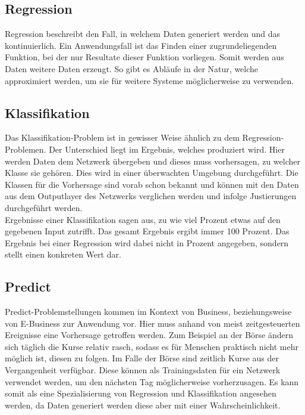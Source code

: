 \subsection{Regression}
\label{subsec:Regression}

Regression beschreibt den Fall, in welchem Daten generiert werden und das kontinuierlich.
Ein Anwendungsfall ist das Finden einer zugrundeliegenden Funktion, bei der nur Resultate dieser Funktion vorliegen. 
Somit werden aus Daten weitere Daten erzeugt.
So gibt es Abläufe in der Natur, welche approximiert werden, um sie für weitere Systeme möglicherweise zu verwenden. \cite{bishop2006pattern}

\subsection{Klassifikation}
\label{subsec:Classification}

Das Klassifikation-Problem ist in gewisser Weise ähnlich zu dem Regression-Problemen. 
Der Unterschied liegt im Ergebnis, welches produziert wird.  
Hier werden Daten dem Netzwerk übergeben und dieses muss vorhersagen, zu welcher Klasse sie gehören. Dies wird in einer überwachten Umgebung durchgeführt. 
Die Klassen für die Vorhersage sind vorab schon bekannt und können mit den Daten aus dem Outputlayer des Netzwerks verglichen werden und infolge Justierungen durchgeführt werden. \cite{AI3} \\

\noindent
Ergebnisse einer Klassifikation sagen aus, zu wie viel Prozent etwas auf den gegebenen Input zutrifft. 
Das gesamt Ergebnis ergibt immer 100 Prozent. 
Das Ergebnis bei einer Regression wird dabei nicht in Prozent angegeben, sondern stellt einen konkreten Wert dar.

\subsection{Predict}
\label{subsec:Predict}

Predict-Problemstellungen kommen im Kontext von Business, beziehungsweise von E-Business zur Anwendung vor. 
Hier muss anhand von meist zeitgesteuerten Ereignisse eine Vorhersage getroffen werden. 
Zum Beispiel an der Börse ändern sich täglich die Kurse relativ rasch, sodass es für Menschen praktisch nicht mehr möglich ist, diesen zu folgen. 
Im Falle der Börse sind zeitlich Kurse aus der Vergangenheit verfügbar. 
Diese können als Trainingsdaten für ein Netzwerk verwendet werden, um den nächsten Tag möglicherweise vorherzusagen. 
Es kann somit als eine Spezialisierung von Regression und Klassifikation angesehen werden, da Daten generiert werden diese aber mit einer Wahrscheinlichkeit.

